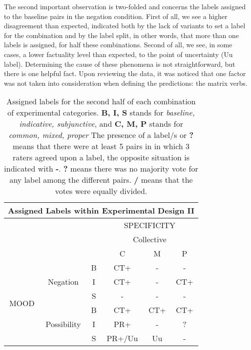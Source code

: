 The second important observation is two-folded and concerns the labels assigned to the baseline pairs in the negation condition. First of all, we see a higher disagreement than expected, indicated both by the lack of variants to set a label for the combination and by the label split, in other words, that more than one labels is assigned, for half these combinations. Second of all, we see, in some cases, a lower factuality level than expected, to the point of uncertainty (Uu label). Determining the cause of these phenomena is not straightforward, but there is one helpful fact. Upon reviewing the data, it was noticed that one factor was not taken into consideration when defining the predictions: the matrix verbs.\\

\begin{table}[h!]
\centering
\begin{tabular}{|c|c|c|c|c|c|}
\hline
\multicolumn{6}{|c|}{Assigned Labels within Experimental Design II}\\\hline
                      & & &\multicolumn{3}{c|}{SPECIFICITY} \\\cline{4-6} 
                      & & &\multicolumn{3}{c|}{Collective}\\\cline{4-6} 
                      & & & C & M & P \\\hline 
\multirow{6}{*}{MOOD} & \multirow{3}{*}{Negation} & B & CT+ & - & - \\\cline{3-6}
                      &                           & I & CT+ & - & CT+ \\\cline{3-6}
                      &                           & S & - & - & - \\ \cline{2-6}                     
                      &\multirow{3}{*}{Possibility}& B & CT+ & CT+ & CT+\\\cline{3-6}
                      &                           & I & PR+ & - & ?\\\cline{3-6}
                      &                           & S & PR+/Uu & Uu & - \\\hline                                                          
\end{tabular}
\caption[Assigned labels II.]{Assigned labels for the second half of each combination of experimental categories. \textbf{B, I, S} stands for \textit{baseline, indicative, subjunctive}, and \textbf{C, M, P} stands for \textit{common, mixed, proper} The presence of a label/s or \textbf{?} means that there were at least 5 pairs in in which 3 raters agreed upon a label, the opposite situation is indicated with \textbf{-}. \textbf{?} means there was no majority vote for any label among the different pairs. \textbf{/} means that the votes were equally divided.}
\label{tab:ass2}
\end{table}

